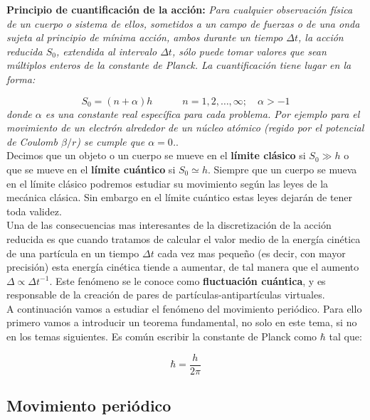 \documentclass[12pt,a4paper]{article}
\numberwithin{equation}{section}
\numberwithin{figure}{section}
\newcommand{\tquad}{\quad \quad \quad}
\begin{document}
\textbf{Principio de cuantificación de la acción:} \textit{Para cualquier observación física de un cuerpo o sistema de ellos, sometidos a un campo de fuerzas o de una onda sujeta al principio de mínima acción, ambos durante un tiempo $\Delta t$, la acción reducida $S_0$, extendida al intervalo $\Delta t$, sólo puede tomar valores que sean múltiplos enteros de la constante de Planck. La cuantificación tiene lugar en la forma:}

\begin{equation}
S_0 = (n+\alpha) h \tquad n=1,2,\ldots,\infty; \quad \alpha > -1
\end{equation}
\textit{donde $\alpha$ es una constante real específica para cada problema. Por ejemplo para el movimiento de un electrón alrededor de un núcleo atómico (regido por el potencial de Coulomb $\beta/r$) se cumple que $\alpha =0$.}. \\

Decimos que un objeto o un cuerpo se mueve en el \textbf{límite clásico} si $S_0 \gg h$ o que se mueve en el \textbf{límite cuántico} si $S_0 \simeq h$. Siempre que un cuerpo se mueva en el límite clásico podremos estudiar su movimiento según las leyes de la mecánica clásica. Sin embargo en el límite cuántico estas leyes dejarán de tener toda validez. \\

Una de las consecuencias mas interesantes de la discretización de la acción reducida es que cuando tratamos de calcular el valor medio de la energía cinética de una partícula en un tiempo $\Delta t$ cada vez mas pequeño (es decir, con mayor precisión) esta energía cinética tiende a aumentar, de tal manera que el aumento $\Delta \varpropto \Delta t^{-1}$. Este fenómeno se le conoce como \textbf{fluctuación cuántica}, y es responsable de la creación de pares de partículas-antipartículas virtuales. \\

A continuación vamos a estudiar el fenómeno del movimiento periódico. Para ello primero vamos a introducir un teorema fundamental, no solo en este tema, si no en los temas siguientes. Es común escribir la constante de Planck como $\hbar$ tal que:

\begin{equation}
\hbar = \dfrac{h}{2 \pi}
\end{equation}

\subsection{Movimiento periódico}
\end{document}
